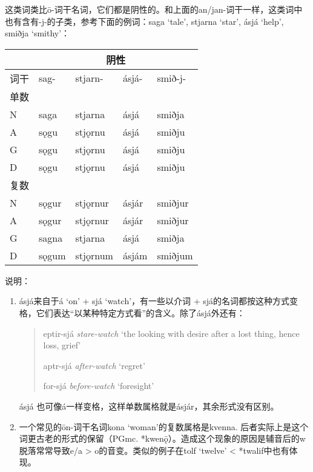 这类词类比ō-词干名词，它们都是阴性的。和上面的an/jan-词干一样，这类词中也有含有-j-的子类，参考下面的例词：saga
`tale', stjarna `star', ásjá `help', smiðja `smithy'：

\begin{longtable}{lllll}
  \toprule
       & \multicolumn{4}{c}{\textbf{阴性}}                              \\
  \midrule
  \endhead
  \bottomrule
  \endfoot
  词干 & sag-                              & stjarn-  & ásjá- & smið-j- \\
  单数 &                                   &          &       &         \\
  N    & saga                              & stjarna  & ásjá  & smiðja  \\
  A    & sǫgu                              & stjǫrnu  & ásjá  & smiðju  \\
  G    & sǫgu                              & stjǫrnu  & ásjá  & smiðju  \\
  D    & sǫgu                              & stjǫrnu  & ásjá  & smiðju  \\
  复数 &                                   &          &       &         \\
  N    & sǫgur                             & stjǫrnur & ásjár & smiðjur \\
  A    & sǫgur                             & stjǫrnur & ásjár & smiðjur \\
  G    & sagna                             & stjarna  & ásjá  & smiðja  \\
  D    & sǫgum                             & stjǫrnum & ásjám & smiðjum \\
\end{longtable}

说明：

\begin{enumerate}
  \item
        ásjá来自于á `on' + sjá `watch'，有一些以介词 +
        sjá的名词都按这种方式变格，它们表达``以某种特定方式看''的含义。除了ásjá外还有：
        \begin{quote}
          eptir-sjá \emph{stare-watch} `the looking with desire after a lost
          thing, hence loss, grief'

          aptr-sjá \emph{after-watch} `regret'

          for-sjá \emph{before-watch} `foresight'

        \end{quote}
        ásjá 也可像á一样变格，这样单数属格就是ásjár，其余形式没有区别。
  \item
        一个常见的ōn-词干名词kona `woman'的复数属格是kvenna.
        后者实际上是这个词更古老的形式的保留（PGmc.
        *kwenǭ）。造成这个现象的原因是辅音后的w脱落常常导致e/a \textgreater{}
        o的音变。类似的例子在tolf `twelve' \textless{} *twalif中也有体现。
\end{enumerate}

